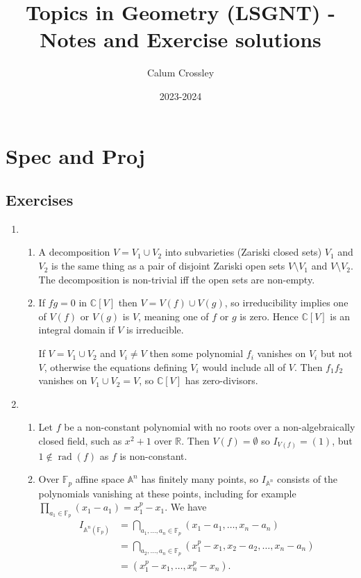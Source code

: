 \documentclass[a4paper]{article}
\title{Topics in Geometry (LSGNT) - Notes and Exercise solutions}
\author{Calum Crossley}
\date{2023-2024}
\theoremstyle{definition}
\theoremstyle{remark}
\DeclareMathOperator{\rad}{rad}
\newcommand{\F}{\mathbb{F}}
\newcommand{\A}{\mathbb{A}}
\newcommand{\R}{\mathbb{R}}
\newcommand{\C}{\mathbb{C}}
\begin{document}
\maketitle

\section{Spec and Proj}

\subsection*{Exercises}

\begin{enumerate}

\item
\begin{enumerate}[label=(\alph*)]

\item 
A decomposition $V=V_1\cup V_2$ into subvarieties (Zariski
closed sets) $V_1$ and $V_2$ is the same thing as a pair of
disjoint Zariski open sets $V\setminus V_1$ and
$V\setminus V_2$. The decomposition is non-trivial iff the open
sets are non-empty.

\item
If $fg=0$ in $\C[V]$ then $V=V(f)\cup V(g)$, so irreducibility
implies one of $V(f)$ or $V(g)$ is $V$, meaning one of $f$ or
$g$ is zero. Hence $\C[V]$ is an integral domain if $V$ is
irreducible.

If $V=V_1\cup V_2$ and $V_i\ne V$ then some polynomial
$f_i$ vanishes on $V_i$ but not $V$, otherwise the equations
defining $V_i$ would include all of $V$. Then $f_1f_2$ vanishes
on $V_1\cup V_2=V$, so $\C[V]$ has zero-divisors.

\end{enumerate}

\item
\begin{enumerate}[label=(\alph*)]

\item 
Let $f$ be a non-constant polynomial with no roots over a non-algebraically
closed field, such as $x^2+1$ over $\R$. Then $V(f)=\emptyset$ so
$I_{V(f)}=(1)$, but $1\notin\rad(f)$ as $f$ is non-constant.

\item
Over $\F_p$ affine space $\A^n$ has finitely many points, so $I_{\A^n}$ consists
of the polynomials vanishing at these points, including for example
$\prod_{a_1\in\F_p}(x_1-a_1)=x_1^p-x_1$. We have
\begin{align*}
    I_{\A^n(\F_p)}
        &= \bigcap_{a_1,\ldots,a_n\in\F_p}(x_1-a_1,\ldots,x_n-a_n) \\
        &= \bigcap_{a_2,\ldots,a_n\in\F_p}(x_1^p-x_1,x_2-a_2,\ldots,x_n-a_n) \\
        &= (x_1^p-x_1,\ldots,x_n^p-x_n).
\end{align*}


\end{enumerate}
\end{enumerate}
\end{document}
